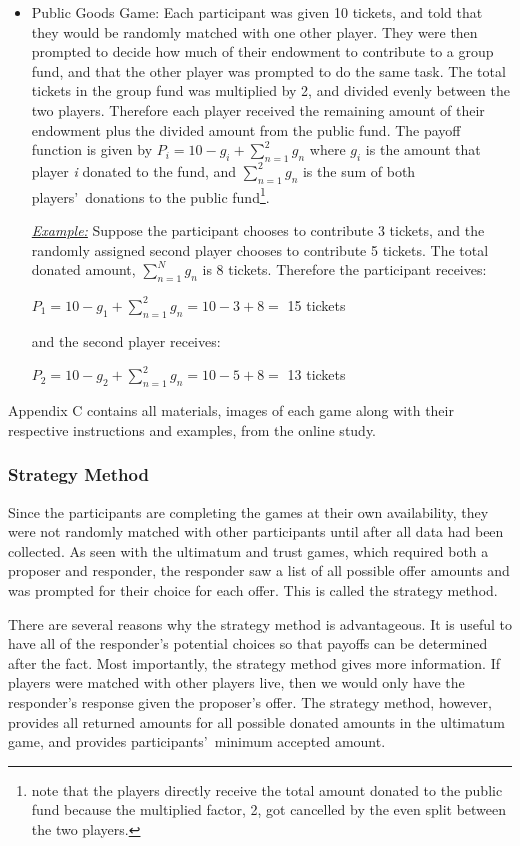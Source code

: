 \documentclass[12pt]{article}
\begin{document}
\begin{itemize}
\item{Public Goods Game}: Each participant was given 10 tickets, and told that they would be randomly matched with one other player. They were then prompted to decide how much of their endowment to contribute to a group fund, and that the other player was prompted to do the same task. The total tickets in the group fund was multiplied by 2, and divided evenly between the two players. Therefore each player received the remaining amount of their endowment plus the divided amount from the public fund. The payoff function is given by \( P_{i} = 10 - g_{i} + \sum_{n=1}^{2} g_{n} \) where \(g_{i}\) is the amount that player \textit{i} donated to the fund, and \(\sum_{n=1}^{2}g_{n}\) is the sum of both players\rq \ donations to the public fund\footnote{note that the players directly receive the total amount donated to the public fund because the multiplied factor, 2, got cancelled by the even split between the two players.}.

\subitem \underline{\textit{Example:}} Suppose the participant chooses to contribute 3 tickets, and the randomly assigned second player chooses to contribute 5 tickets. The total donated amount, \(\sum_{n=1}^{N} g_{n}\) is 8 tickets. Therefore the participant receives: 

\( P_{1} = 10 - g_{1} +  \sum_{n=1}^{2} g_{n} = 10 - 3 + 8 = \) 15 tickets 

and the second player receives: 

\( P_{2} = 10 - g_{2} +  \sum_{n=1}^{2} g_{n} = 10 - 5 + 8 = \) 13 tickets 


\end{itemize}

Appendix C contains all materials, images of each game along with their respective instructions and examples, from the online study.

\subsubsection{Strategy Method}

Since the participants are completing the games at their own availability, they were not randomly matched with other participants until after all data had been collected. As seen with the ultimatum and trust games, which required both a proposer and responder, the responder saw a list of all possible offer amounts and was prompted for their choice for each offer. This is called the strategy method.

There are several reasons why the strategy method is advantageous. It is useful to have all of the responder\rq s potential choices so that payoffs can be determined after the fact. Most importantly, the strategy method gives more information. If players were matched with other players live, then we would only have the responder\rq s response given the proposer\rq s offer. The strategy method, however, provides all returned amounts for all possible donated amounts in the ultimatum game, and provides participants\rq \ minimum accepted amount. 
\end{document}
